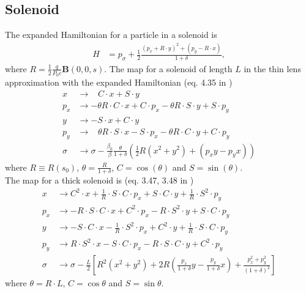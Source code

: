 \documentclass[english]{article}
\begin{document}
\subsection{Solenoid}
The expanded Hamiltonian for a particle in a solenoid is
\begin{align}
  H &= p_\sigma+\frac{1}{2}\frac{(p_x+R\cdot y)^2+(p_y-R\cdot x)}{1+\delta},
\end{align}
where $R=\frac{1}{2}\frac{q}{P_0c}\mathbf{B}(0,0,s)$. The map for a solenoid 
of length $L$ in the thin lens approximation with the expanded 
Hamiltonian (eq. 4.35 in \cite{heinemann95})
\begin{align}
  x   &\to \,\,\,\,\, C\cdot x + S\cdot y \\
  p_x &\to -\theta R\cdot C \cdot x+C\cdot p_x
        -\theta R\cdot S\cdot y+S\cdot p_y \\
  y   &\to -S\cdot x + C\cdot y \\
  p_y &\to \,\,\,\,\, \theta R\cdot S\cdot x - S\cdot p_x 
  - \theta R\cdot C \cdot y + C\cdot p_y \\
  \sigma &\to \sigma - \frac{\beta_0}{\beta}
  \frac{\theta}{1+\delta} \left(\frac{1}{2}
  R (x^2 + y^2) + (p_xy - p_yx)\right)
\end{align}
where $R\equiv R(s_0)$, $\theta=\frac{R}{1+\delta}$, 
$C=\cos(\theta)$ and $S=\sin(\theta)$.\\[0.5em]
The map for a thick solenoid is (eq. 3.47, 3.48 in \cite{ripken85}) 
\begin{align}
    x &\to C^2 \cdot x+\frac{1}{R}\cdot S\cdot C\cdot p_x+S\cdot C\cdot y
    + \frac{1}{R}\cdot S^2 \cdot p_y \\
    p_x &\to -R\cdot S\cdot C\cdot x + C^2\cdot p_x
    -R\cdot S^2\cdot y + S\cdot C\cdot p_y \\
    y &\to -S\cdot C\cdot x -\frac{1}{R}\cdot S^2 \cdot p_x
    +C^2\cdot y + \frac{1}{R}\cdot S\cdot C\cdot p_y \\
    p_y &\to R\cdot S^2\cdot x -S\cdot C\cdot p_x
    -R\cdot S\cdot C\cdot y + C^2\cdot p_y \\
    \sigma &\to \sigma - \frac{L}{2} \left[R^2(x^2+y^2)+2R\left(
    \frac{p_x}{1+\delta}y - \frac{p_y}{1+\delta}x\right) 
    + \frac{p_x^2+p_y^2}{(1+\delta)^2} \right]
\end{align}
where $\theta=R\cdot L$, $C=\cos\theta$ and $S=\sin\theta$.
\end{document}
